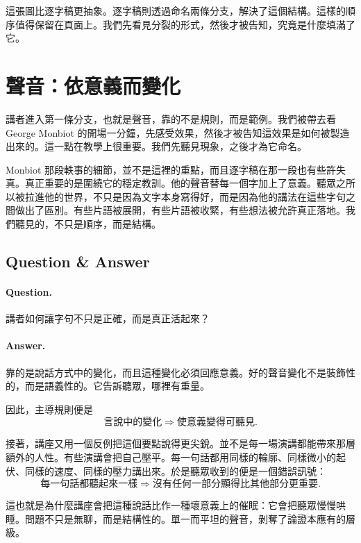 這張圖比逐字稿更抽象。逐字稿則透過命名兩條分支，解決了這個結構。這樣的順序值得保留在頁面上。我們先看見分裂的形式，然後才被告知，究竟是什麼填滿了它。

\section{聲音：依意義而變化}

講者進入第一條分支，也就是聲音，靠的不是規則，而是範例。我們被帶去看 George Monbiot 的開場一分鐘，先感受效果，然後才被告知這效果是如何被製造出來的。這一點在教學上很重要。我們先聽見現象，之後才為它命名。

Monbiot 那段軼事的細節，並不是這裡的重點，而且逐字稿在那一段也有些許失真。真正重要的是圍繞它的穩定教訓。他的聲音替每一個字加上了意義。聽眾之所以被拉進他的世界，不只是因為文字本身寫得好，而是因為他的講法在這些字句之間做出了區別。有些片語被展開，有些片語被收緊，有些想法被允許真正落地。我們聽見的，不只是順序，而是結構。

\subsection{Question \& Answer}

\paragraph{Question.} 講者如何讓字句不只是正確，而是真正活起來？

\paragraph{Answer.} 靠的是說話方式中的變化，而且這種變化必須回應意義。好的聲音變化不是裝飾性的，而是語義性的。它告訴聽眾，哪裡有重量。

因此，主導規則便是
\begin{equation}
\text{言說中的變化} \Longrightarrow \text{使意義變得可聽見}.
\end{equation}

接著，講座又用一個反例把這個要點說得更尖銳。並不是每一場演講都能帶來那層額外的人性。有些演講會把自己壓平。每一句話都用同樣的輪廓、同樣微小的起伏、同樣的速度、同樣的壓力講出來。於是聽眾收到的便是一個錯誤訊號：
\begin{equation}
\text{每一句話都聽起來一樣} \Longrightarrow \text{沒有任何一部分顯得比其他部分更重要}.
\end{equation}

這也就是為什麼講座會把這種說話比作一種壞意義上的催眠：它會把聽眾慢慢哄睡。問題不只是無聊，而是結構性的。單一而平坦的聲音，剝奪了論證本應有的層級。

